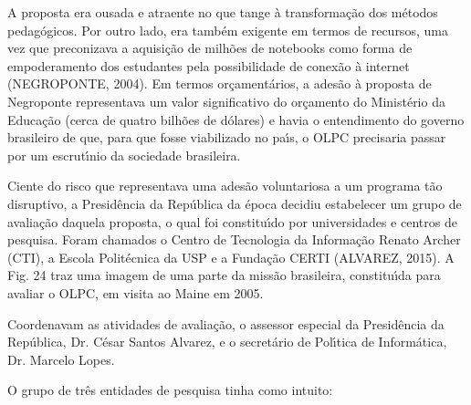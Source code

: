 \documentclass[
12pt,		%
openright,	%
twoside,  %
a4paper,			%
chapter=TITLE,		%
english,			%
french,				%
spanish,			%
brazil				%
]{USPSC-classe/USPSC}
\begin{document}
A proposta era ousada e atraente no que tange \`a transforma\c{c}\~ao dos m\'etodos pedag\'ogicos. Por outro lado, era tamb\'em exigente em termos de recursos, uma vez que preconizava a aquisi\c{c}\~ao de milh\~oes de notebooks como forma de empoderamento dos estudantes pela possibilidade de conex\~ao \`a internet  (NEGROPONTE, 2004). Em termos or\c{c}ament\'arios, a ades\~ao \`a proposta de Negroponte representava um valor significativo do or\c{c}amento do Minist\'erio da Educa\c{c}\~ao (cerca de quatro bilh\~oes de d\'olares) e havia o entendimento do governo brasileiro de que, para que fosse viabilizado no pa\'{\i}s, o OLPC precisaria passar por um escrut\'{\i}nio da sociedade brasileira.

















Ciente do risco que representava uma ades\~ao voluntariosa a um programa t\~ao disruptivo, a Presid\^encia da Rep\'ublica da \'epoca decidiu estabelecer um grupo de avalia\c{c}\~ao  daquela proposta, o  qual foi constitu\'{\i}do por universidades e centros de pesquisa. Foram chamados o Centro de Tecnologia da Informa\c{c}\~ao Renato Archer (CTI), a Escola Polit\'ecnica da USP e a Funda\c{c}\~ao CERTI (ALVAREZ, 2015). A Fig. 24 traz uma imagem de uma parte da miss\~ao brasileira, constitu\'{\i}da para avaliar o OLPC, em visita ao Maine em 2005.

















Coordenavam as atividades de avalia\c{c}\~ao, o assessor especial da Presid\^encia da Rep\'ublica, Dr. C\'esar Santos Alvarez, e o secret\'ario de Pol\'{\i}tica de Inform\'atica, Dr. Marcelo Lopes.

















O grupo de tr\^es entidades de pesquisa tinha como intuito:
\end{document}
